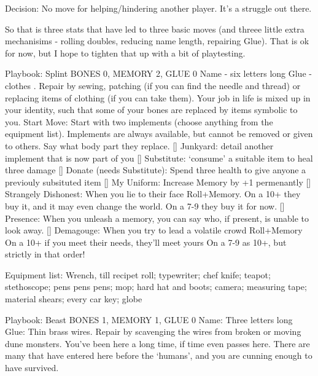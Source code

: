 Decision: No move for helping/hindering another player. It's a struggle out there. 

So that is three stats that have led to three basic moves (and threee little extra mechanisims - rolling doubles, reducing name length, repairing Glue). That is ok for now, but I hope to tighten that up with a bit of playtesting.


Playbook: Splint
BONES 0, MEMORY 2, GLUE 0  
Name - six letters long
Glue - clothes . Repair by sewing, patching (if you can find the needle and thread) or replacing items of clothing (if you can take them). 		
Your job in life is mixed up in your identity, such that some of your bones are replaced by items symbolic to you. 
Start Move: Start with two implements (choose anything from the equipment list). Implements are always available, but cannot be removed or given to others. Say what body part they replace.
[] Junkyard: detail another implement that is now part of you
[] Substitute: `consume' a suitable item to heal three damage
[] Donate (needs Substitute): Spend three health to give anyone a previouly subsituted item
[] My Uniform: Increase Memory by +1 permenantly
[] Strangely Dishonest: When you lie to their face Roll+Memory. 
On a 10+ they buy it, and it may even change the world. 
On a 7-9 they buy it for now.
[] Presence: When you unleash a memory, you can say who, if present, is unable to look away. 
[] Demagouge: When you try to lead a volatile crowd Roll+Memory
On a 10+ if you meet their needs, they'll meet yours
On a 7-9 as 10+, but strictly in that order!

Equipment list: Wrench, till recipet roll; typewriter; chef knife; teapot; stethoscope; pens pens pens; mop; hard hat and boots; camera; measuring tape; material shears; every car key; globe


Playbook: Beast
BONES 1, MEMORY 1, GLUE 0  
Name: Three letters long
Glue: Thin brass wires. Repair by scavenging the wires from broken or moving dune monsters.
You've been here a long time, if time even passes here. There are many that have entered here before the `humans', and you are cunning enough to have survived.

